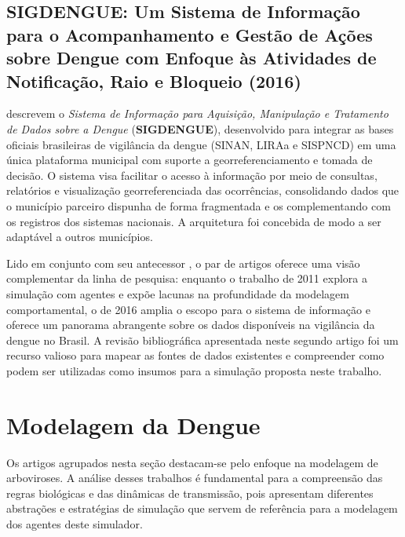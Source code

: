 \begin{apendicesenv}
\subsection{SIGDENGUE: Um Sistema de Informação para o Acompanhamento e Gestão
de Ações sobre Dengue com Enfoque às Atividades de Notificação, Raio e Bloqueio
(2016)}
\label{ap:rizzi2016}

 descrevem o \textit{Sistema de Informação para
Aquisição, Manipulação e Tratamento de Dados sobre a Dengue} (\textbf{SIGDENGUE}),
desenvolvido para integrar as bases oficiais brasileiras de vigilância da dengue
(SINAN, LIRAa e SISPNCD) em uma única plataforma municipal com suporte a
georreferenciamento e tomada de decisão. O sistema visa facilitar o acesso à
informação por meio de consultas, relatórios e visualização georreferenciada das
ocorrências, consolidando dados que o município parceiro dispunha de forma
fragmentada e os complementando com os registros dos sistemas nacionais. A
arquitetura foi concebida de modo a ser adaptável a outros municípios.

Lido em conjunto com seu antecessor \cite{rizzi2011}, o par de artigos
oferece uma visão complementar da linha de pesquisa: enquanto o trabalho de 2011
explora a simulação com agentes e expõe lacunas na profundidade da modelagem
comportamental, o de 2016 amplia o escopo para o sistema de informação e oferece
um panorama abrangente sobre os dados disponíveis na vigilância da dengue no Brasil.
A revisão bibliográfica apresentada neste segundo artigo foi um recurso valioso para
mapear as fontes de dados existentes e compreender como podem ser utilizadas como
insumos para a simulação proposta neste trabalho.

\section{Modelagem da Dengue}
\label{ap:abm-mosquitos}

Os artigos agrupados nesta seção destacam-se pelo enfoque na modelagem de
arboviroses. A análise desses trabalhos é fundamental para a compreensão das regras
biológicas e das dinâmicas de transmissão, pois apresentam diferentes abstrações e
estratégias de simulação que servem de referência para a modelagem dos agentes deste
simulador.


\end{apendicesenv}
